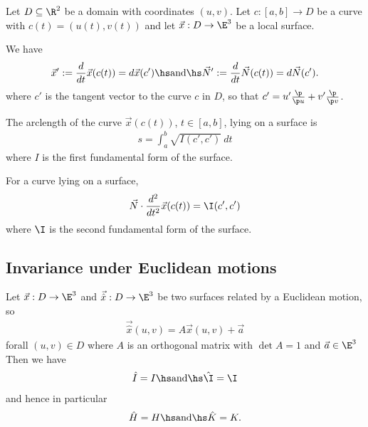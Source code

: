 \documentclass{article}
\begin{document}
Let $D\subseteq\R^2$ be a domain with coordinates $(u,v)$.
Let $c:[a,b]\to D$ be a curve with $c(t)=(u(t),v(t))$ and let $\vec x: D\to\E^3$ be a 
local surface.

\begin{lemma}[Notes 9.1]
    We have 
    \begin{align*}
        \vec x' := \frac{d}{dt}\vec x(c(t)) = d\vec x(c')\hs\text{and}\hs 
        \vec N' := \frac{d}{dt}\vec N(c(t)) = d\vec N(c').
    \end{align*}
    where $c'$ is the tangent vector to the curve $c$ in $D$, so that 
    $c'=u'\frac{\p }{\p u}+v'\frac{\p }{\p v}$.
\end{lemma}

\begin{proposition}[Notes 9.2]
    The arclength of the curve $\vec x(c(t))$, $t\in[a,b]$, lying on a surface is 
    \begin{align*}
        s = \int_a^b \sqrt{I(c',c')}\:dt
    \end{align*}
    where $I$ is the first fundamental form of the surface.
\end{proposition}

\begin{proposition}[Notes 9.5]
    For a curve lying on a surface,
    \begin{align*}
        \vec N\cdot \frac{d^2}{dt^2}\vec x(c(t)) = \I(c',c')
    \end{align*}
    where $\I$ is the second fundamental form of the surface.
\end{proposition}

\subsection{Invariance under Euclidean motions}

\begin{theorem}[Notes 9.7]
    Let $\vec x: D\to\E^3$ and $\vec{\hat x}:D\to\E^3$ be two surfaces related by a 
    Euclidean motion, so 
    \begin{align*}
        \vec{\hat x} (u,v) = A\vec x(u,v)+\vec a
    \end{align*}
    forall $(u,v)\in D$ where $A$ is an orthogonal matrix with $\det A=1$ and $\vec a\in\E^3$
    Then we have 
    \begin{align*}
        \hat I = I \hs \text{and} \hs \hat\I = \I
    \end{align*}
    and hence in particular
    \begin{align*}
        \hat H = H \hs \text{and} \hs \hat K = K.
    \end{align*}
\end{theorem}
\end{document}
